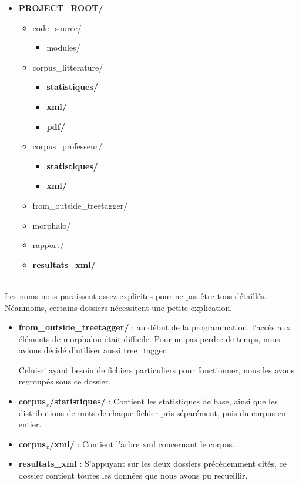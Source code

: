 {\begin{minipage}[t]{.4\textwidth}
{\begin{itemize}
\item \textbf{PROJECT\_ROOT/}
	\begin{itemize}
	\item {code\_source/}
		\begin{itemize}
			\item {modules/}
		\end{itemize}
	\item {corpus\_litterature/}
		\begin{itemize}
		\item \textbf{statistiques/}
		\item \textbf{xml/}
		\item \textbf{pdf/}
		\end{itemize}
	\item {corpus\_professeur/}
		\begin{itemize}
		\item \textbf{statistiques/}
		\item \textbf{xml/}
		\end{itemize}
	\item {from\_outside\_treetagger/}
	\item {morphalo/}
	\item {rapport/}
	\item \textbf{resultats\_xml/}
	\end{itemize}
\end{itemize}
}
\end{minipage}
} 

~\\

Les noms nous paraissent assez explicites pour ne pas être tous détaillés. Néanmoins, certains dossiers nécessitent  une petite explication.

	\begin{itemize}
	\item \textbf{from\_outside\_treetagger/} : au début de la programmation, l'accès aux éléments de morphalou était difficile. Pour ne pas perdre de temps, nous avions décidé d'utiliser aussi tree\_tagger.
	
	Celui-ci ayant besoin de fichiers particuliers pour fonctionner, nous les avons regroupés sous ce dossier.
	
	\item \textbf{corpus$_x$/statistiques/} : Contient les statistiques de base, ainsi que les distributions de mots de chaque fichier pris séparément, puis du corpus en entier.
	
	\item \textbf{corpus$_x$/xml/} : Contient l'arbre xml concernant le corpus.
	
	\item \textbf{resultats\_xml} : S'appuyant sur les deux dossiers précédemment cités, ce dossier contient toutes les données que nous avons pu recueillir.
	\end{itemize}

